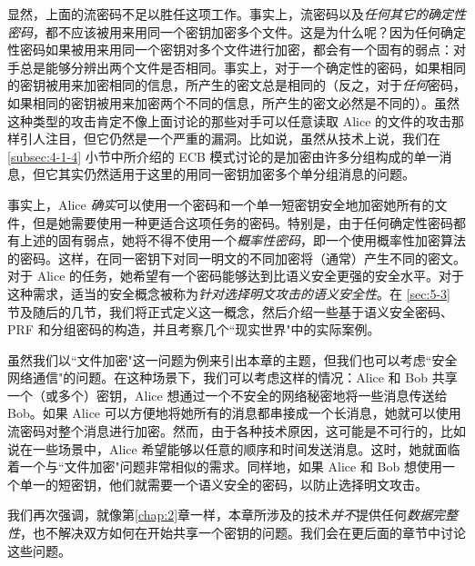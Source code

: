 显然，上面的流密码不足以胜任这项工作。事实上，流密码以及\emph{任何其它的确定性密码}，都不应该被用来用同一个密钥加密多个文件。这是为什么呢？因为任何确定性密码如果被用来用同一个密钥对多个文件进行加密，都会有一个固有的弱点：对手总是能够分辨出两个文件是否相同。事实上，对于一个确定性的密码，如果相同的密钥被用来加密相同的信息，所产生的密文总是相同的（反之，对于\emph{任何}密码，如果相同的密钥被用来加密两个不同的信息，所产生的密文必然是不同的）。虽然这种类型的攻击肯定不像上面讨论的那些对手可以任意读取 Alice 的文件的攻击那样引人注目，但它仍然是一个严重的漏洞。比如说，虽然从技术上说，我们在 \ref{subsec:4-1-4} 小节中所介绍的 ECB 模式讨论的是加密由许多分组构成的单一消息，但它其实仍然适用于这里的用同一密钥加密多个单分组消息的问题。

事实上，Alice \emph{确实}可以使用一个密码和一个单一短密钥安全地加密她所有的文件，但是她需要使用一种更适合这项任务的密码。特别是，由于任何确定性密码都有上述的固有弱点，她将不得不使用一个\emph{概率性密码}，即一个使用概率性加密算法的密码。这样，在同一密钥下对同一明文的不同加密将（通常）产生不同的密文。对于 Alice 的任务，她希望有一个密码能够达到比语义安全更强的安全水平。对于这种需求，适当的安全概念被称为\emph{针对选择明文攻击的语义安全性}。在 \ref{sec:5-3} 节及随后的几节，我们将正式定义这一概念，然后介绍一些基于语义安全密码、PRF 和分组密码的构造，并且考察几个``现实世界"中的实际案例。

虽然我们以``文件加密"这一问题为例来引出本章的主题，但我们也可以考虑``安全网络通信"的问题。在这种场景下，我们可以考虑这样的情况：Alice 和 Bob 共享一个（或多个）密钥，Alice 想通过一个不安全的网络秘密地将一些消息传送给 Bob。如果 Alice 可以方便地将她所有的消息都串接成一个长消息，她就可以使用流密码对整个消息进行加密。然而，由于各种技术原因，这可能是不可行的，比如说在一些场景中，Alice 希望能够以任意的顺序和时间发送消息。这时，她就面临着一个与``文件加密"问题非常相似的需求。同样地，如果 Alice 和 Bob 想使用一个单一的短密钥，他们就需要一个语义安全的密码，以防止选择明文攻击。

我们再次强调，就像第\ref{chap:2}章一样，本章所涉及的技术\emph{并不}提供任何\emph{数据完整性}，也不解决双方如何在开始共享一个密钥的问题。我们会在更后面的章节中讨论这些问题。
